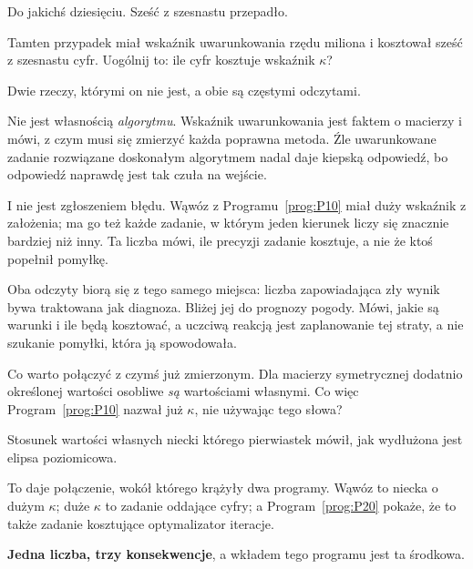 
\begin{fr}
\begin{ansblock}
Do jakichś dziesięciu. Sześć z szesnastu przepadło.
\end{ansblock}

Tamten przypadek miał wskaźnik uwarunkowania rzędu miliona i kosztował sześć z
szesnastu cyfr. Uogólnij to: ile cyfr kosztuje wskaźnik $\kappa$?
\dotline
\nextframe
\end{fr}

\begin{fr}
Dwie rzeczy, którymi on nie jest, a obie są częstymi odczytami.

Nie jest własnością \emph{algorytmu}. Wskaźnik uwarunkowania jest faktem o
macierzy i mówi, z czym musi się zmierzyć każda poprawna metoda. Źle
uwarunkowane zadanie rozwiązane doskonałym algorytmem nadal daje kiepską
odpowiedź, bo odpowiedź naprawdę jest tak czuła na wejście.

I nie jest zgłoszeniem błędu. Wąwóz z Programu~\ref{prog:P10} miał duży
wskaźnik z założenia; ma go też każde zadanie, w którym jeden kierunek liczy
się znacznie bardziej niż inny. Ta liczba mówi, ile precyzji zadanie
kosztuje, a nie że ktoś popełnił pomyłkę.

Oba odczyty biorą się z tego samego miejsca: liczba zapowiadająca zły wynik
bywa traktowana jak diagnoza. Bliżej jej do prognozy pogody. Mówi, jakie są
warunki i ile będą kosztować, a uczciwą reakcją jest zaplanowanie tej straty, a
nie szukanie pomyłki, która ją spowodowała.

Co warto połączyć z czymś już zmierzonym. Dla macierzy symetrycznej dodatnio
określonej wartości osobliwe \emph{są} wartościami własnymi. Co więc
Program~\ref{prog:P10} nazwał już $\kappa$, nie używając tego słowa?
\dotline
\nextframe
\end{fr}

\begin{fr}
\begin{ansblock}
Stosunek wartości własnych niecki \dash{} którego pierwiastek mówił, jak
wydłużona jest elipsa poziomicowa.
\end{ansblock}

To daje połączenie, wokół którego krążyły dwa programy. Wąwóz to niecka o
dużym $\kappa$; duże $\kappa$ to zadanie oddające cyfry; a
Program~\ref{prog:P20} pokaże, że to także zadanie kosztujące optymalizator
iteracje.

\textbf{Jedna liczba, trzy konsekwencje}, a wkładem tego programu jest ta
środkowa.
\end{fr}

